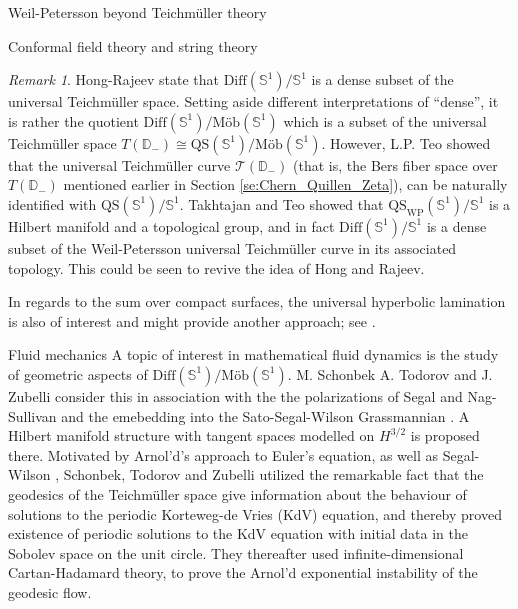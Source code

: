 \documentclass[12pt]{amsart}
\newcommand{\disk}{\ensuremath{\mathbb{D}} } %
\theoremstyle{plain}
\theoremstyle{definition}
\theoremstyle{remark}
\newtheorem{remark}[theorem]{Remark}
\numberwithin{equation}{section} %
\numberwithin{figure}{section} %
\begin{document}
\begin{section}{Weil-Petersson beyond Teichm\"uller theory}
\begin{subsection}{Conformal field theory and string theory}
\begin{remark}
Hong-Rajeev \cite{HongRajeev} state that $\mathrm{Diff}(\mathbb{S}^1)/\mathbb{S}^1$ is a dense subset of the universal Teichm\"uller space. Setting aside different interpretations of  ``dense'', it is rather the quotient $\mathrm{Diff}(\mathbb{S}^1)/\text{M\"ob}(\mathbb{S}^1)$ which is a subset of the universal Teichm\"uller space $T(\disk_-) \cong \text{QS}(\mathbb{S}^1)/\text{M\"ob}(\mathbb{S}^1)$. However, L.P. Teo \cite{TeoVelling} showed that the universal Teichm\"uller curve $\mathscr{T}(\disk_-)$ (that is, the Bers fiber space over $T(\disk_-)$ mentioned earlier in Section \ref{se:Chern_Quillen_Zeta}), can be naturally identified with $\text{QS}(\mathbb{S}^1)/\mathbb{S}^1$. 
Takhtajan and Teo \cite{Takhtajan_Teo_Memoirs} showed that $\text{QS}_{\text{WP}}(\mathbb{S}^1)/\mathbb{S}^1$ is a Hilbert manifold and a topological group, and in fact $\mathrm{Diff}(\mathbb{S}^1)/\mathbb{S}^1$ is a dense subset of the Weil-Petersson universal Teichm\"uller curve in its associated topology. This could be seen to revive the idea of Hong and Rajeev.  
\end{remark}

In regards to the sum over compact surfaces, the universal hyperbolic lamination is also of interest and might provide another approach; see \cite{Sullivan_lamination,NagSullivan,Burgos_Verjovsky}. 
\end{subsection}
\begin{subsection}{Fluid mechanics}
A topic of interest in mathematical fluid dynamics is the study of geometric aspects of $\text{Diff}(\mathbb{S}^1)/\text{M\"ob}(\mathbb{S}^1)$.  M. Schonbek A. Todorov and J. Zubelli \cite{SchonTodZub} consider this in association with the the polarizations of Segal \cite{SegalUnitary} and Nag-Sullivan \cite{NagSullivan} and the emebedding into the Sato-Segal-Wilson Grassmannian \cite{SegalWilson}.  
A Hilbert manifold structure with tangent spaces modelled on $H^{3/2}$ is proposed there.  Motivated by Arnol'd's approach to Euler's equation, {as well as Segal-Wilson \cite{SegalWilson}},  Schonbek, Todorov and Zubelli 
utilized the remarkable fact that the geodesics of the Teichm\"uller space give information about the behaviour of solutions to the
periodic Korteweg-de Vries (KdV) equation, and thereby proved existence of periodic
solutions to the KdV equation with initial data in the Sobolev space on the unit circle. They thereafter used infinite-dimensional 
Cartan-Hadamard theory, to prove the Arnol'd exponential instability of the geodesic flow.\\


\end{subsection}
\end{section}
\end{document}
